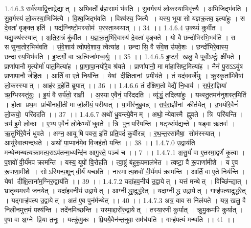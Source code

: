 1.4.6.3
सर्व॑स्माद्वि॒त्ताद्वेद्यात् । अ॒भि॒व॒र्तो ब्र॑ह्मसा॒मं भ॑वति । सु॒व॒र्गस्य॑ लो॒कस्या॒भिवृ॑त्त्यै । अ॒भि॒जिद्भ॑वति । सु॒व॒र्गस्य॑ लो॒कस्या॒भिजि॑त्यै । वि॒श्व॒जिद्भ॑वति । विश्व॑स्य॒ जित्यै । यस्य॒ भूया॑सो यज्ञक्र॒तव॒ इत्या॑हुः । स दे॒वता॑ वृङ्क्त॒ इति॑ । यद्य॑ग्निष्टो॒मस्सोम॑ प॒रस्ता॒थ्स्यात् ।। 34 ।।
1.4.6.4
उ॒क्थ्यं॑ कुर्वीत । यद्यु॒क्थ॑स्स्यात् । अ॒ति॒रा॒त्रं कु॑र्वीत । य॒ज्ञ॒क्र॒तुभि॑रे॒वास्य॑ दे॒वता॑ वृङ्क्ते । यो वै छन्दो॑भिरभि॒भव॑ति । स स॑सुन्व॒तोर॒भिभ॑वति । सं॒वे॒शाय॑ त्वोपवे॒शाय॒ त्वेत्या॑ह । छन्दा॑सि॒ वै सं॑वे॒श उ॑पवे॒शः । छन्दो॑भिरे॒वास्य॒ छन्दा॑स्य॒भिभ॑वति । इ॒ष्टर्गो॒ वा ऋ॒त्विजा॑मध्व॒र्युः ।। 35 ।।
1.4.6.5
इ॒ष्टर्ग॒ खलु॒ वै पूर्वो॒ऽर्ष्टुः क्षी॑यते । प्राणा॑पानौ मृ॒त्योर्मा॑ पात॒मित्या॑ह । प्रा॒णा॒पा॒नयो॑रे॒व श्र॑यते । प्राणा॑पानौ॒ मा मा॑हासिष्ट॒मित्या॑ह । नैनं॑ पु॒राऽऽयु॑ष प्राणापा॒नौ ज॑हितः । आर्तिं॒ वा ए॒ते निय॑न्ति । येषां दीक्षि॒तानां प्र॒मीय॑ते । तं यद॑व॒वर्जे॑युः । क्रू॒र॒कृता॑मिवैषां लो॒कस्स्यात् । आह॑र द॒हेति॑ ब्रूयात् ।। 36 ।।
1.4.6.6
तं द॑क्षिण॒तो वेद्यै॑ नि॒धाय॑ । स॒र्प॒रा॒ज्ञिया॑ ऋ॒ग्भिस्स्तु॑युः । इ॒यं वै सर्प॑तो॒ राज्ञी । अ॒स्या ए॒वैनं॒ परि॑ददति । व्यृ॑द्धं॒ तदित्या॑हुः । यथ्स्तु॒तमन॑नुशस्त॒मिति॑ । होता प्रथ॒म प्रा॑चीनावी॒ती मार्जा॒लीयं॒ परी॑यात् । या॒मीर॑नुब्रु॒वन्न् । स॒र्प॒रा॒ज्ञीनां कीर्तयेत् । उ॒भयो॑रे॒वैनं॑ लो॒कयो॒ परि॑ददति ।। 37 ।।
1.4.6.7
अथो॑ धु॒वन्त्ये॒वैनम् । अथो॒ न्ये॑वास्मै ह्नुवते । त्रि परि॑यन्ति । त्रय॑ इ॒मे लो॒काः । ए॒भ्य ए॒वैनं॑ लो॒केभ्यो॑ धुवते । त्रि पुन॒परि॑यन्ति । षट्थ्संप॑द्यन्ते । षड्वा ऋ॒तवः॑ । ऋ॒तुभि॑रे॒वैनं॑ धुवते । अग्न॒ आयू॑षि पवस॒ इति॑ प्रति॒पदं॑ कुर्वीरन्न् । र॒थ॒न्त॒रसा॑मैषा॒॒ सोम॑स्स्यात् । आयु॑रे॒वात्मन्द॑धते । अथो॑ पा॒प्मान॑मे॒व वि॒जह॑तो यन्ति ।। 38 ।।
1.4.7.0
उ॒द्वाय॑ति मन्थेन्मन्थत्यक्रामत्प॒राऽप॑तन्म॒ध्यन्दि॑न आगु॒रते॒ पञ्च॑ च ।। 7 ।।
1.4.7.1
अ॒सु॒र्यं॑ वा ए॒तस्मा॒द्वर्णं॑ कृ॒त्वा । प॒शवो॑ वी॒र्य॑मप॑ क्रामन्ति । यस्य॒ यूपो॑ वि॒रोह॑ति । त्वा॒ष्ट्रं ब॑हुरू॒पमाल॑भेत । त्वष्टा॒ वै रू॒पाणा॑मीशे । य ए॒व रू॒पाणा॒मीशे । सोऽस्मिन्प॒शून् वी॒र्यं॑ यच्छति । नास्मात्प॒शवो॑ वी॒र्य॑मप॑ क्रामन्ति । आर्तिं॒ वा ए॒ते निय॑न्ति । येषां दीक्षि॒ताना॑म॒ग्निरु॒द्वाय॑ति ।। 39 ।।
1.4.7.2
यदा॑हव॒नीय॑ उ॒द्वायेत् । यत्तं मन्थेत् । विच्छि॑न्द्यात् । भ्रातृ॑व्यमस्मै जनयेत् । यदा॑हव॒नीय॑ उ॒द्वायेत् । आग्नीद्ध्रा॒दुद्ध॑रेत् । यदाग्नीद्ध्र उ॒द्वायेत् । गाऱ्ह॑पत्या॒दुद्ध॑रेत् । यद्गाऱ्ह॑पत्य उ॒द्वायेत् । अत॑ ए॒व पुन॑र्मन्थेत् ।। 40 ।।
1.4.7.3
अत्र॒ वाव स निल॑यते । यत्र॒ खलु॒ वै निली॑नमुत्त॒मं पश्य॑न्ति । तदे॑नमिच्छन्ति । यस्मा॒द्दारो॑रु॒द्वायेत् । तस्या॒रणी॑ कुर्यात् । क्रु॒मु॒कमपि॑ कुर्यात् । ए॒षा वा अ॒ग्ने प्रि॒या त॒नूः । यत्क्रु॑मु॒कः । प्रि॒ययै॒वैन॑न्त॒नुवा॒ सम॑र्धयति । गाऱ्ह॑पत्यं मन्थति ।। 41 ।।
